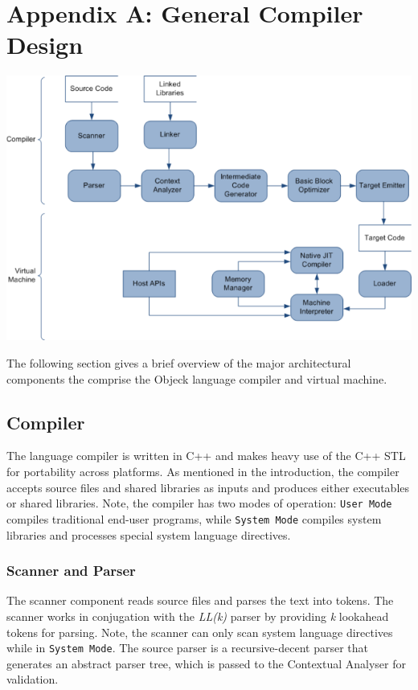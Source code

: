 \documentclass[12pt]{article}
\begin{document}
\section{Appendix A: General Compiler Design}
\includegraphics[scale=0.60]{../images/compiler_data_flow.png}

The following section gives a brief overview of the major architectural components the comprise the Objeck language compiler and virtual machine.

\subsection{Compiler}
The language compiler is written in C++ and makes heavy use of the C++ STL for portability across platforms.  As mentioned in the introduction, the compiler accepts source files and shared libraries as inputs and produces either executables or shared libraries.  Note, the compiler has two modes of operation: \texttt{User Mode} compiles traditional end-user programs, while \texttt{System Mode} compiles system libraries and processes special system language directives.

\subsubsection{Scanner and Parser}
The scanner component reads source files and parses the text into tokens.  The scanner works in conjugation with the \emph{LL(k)} parser by providing \emph{k} lookahead tokens for parsing.  Note, the scanner can only scan system language directives while in \texttt{System Mode}.  The source parser is a recursive-decent parser that generates an abstract parser tree, which is passed to the Contextual Analyser for validation.
\end{document}
